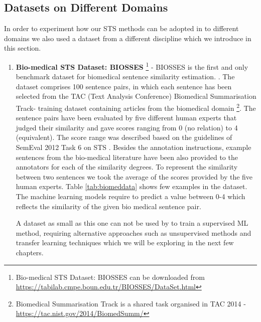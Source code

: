 \subsection{Datasets on Different Domains}
In order to experiment how our STS methods can be adopted in to different domains we also used a dataset from a different discipline which we introduce in this section. 
\begin{enumerate}
	
	\item{ \textbf{Bio-medical STS Dataset: BIOSSES } \footnote{Bio-medical STS Dataset: BIOSSES  can be downloaded from \url{https://tabilab.cmpe.boun.edu.tr/BIOSSES/DataSet.html} }} - BIOSSES is the first and only benchmark dataset for biomedical  sentence  similarity  estimation.
	\cite{10.1093/bioinformatics/btx238}. The  dataset  comprises 100 sentence pairs, in which each sentence has been selected from the TAC (Text Analysis Conference) Biomedical Summarisation Track- training dataset containing articles from  the  biomedical domain \footnote{Biomedical Summarisation Track is a shared task organised in TAC 2014 - \url{https://tac.nist.gov/2014/BiomedSumm/}}. The sentence pairs have been evaluated by five different human experts that judged their similarity and gave scores ranging from 0 (no relation) to 4 (equivalent). The score range was described based on the guidelines of SemEval 2012 Task 6 on STS \cite{agirre-etal-2012-semeval}. Besides the annotation instructions, example sentences from the bio-medical literature 
	have been also provided to the annotators for each of the similarity degrees. To represent the similarity between two sentences we took the average of the scores provided by the five human experts. Table \ref{tab:biomeddata} shows few examples in the dataset. The machine learning models require to predict a value between 0-4 which reflects the similarity of the given bio medical sentence pair.
	
	A dataset as small as this one can not be used by to train a supervised ML method, requiring alternative approaches such as unsupervised methods and transfer learning techniques which we will be exploring in the next few chapters.
	

\end{enumerate}
